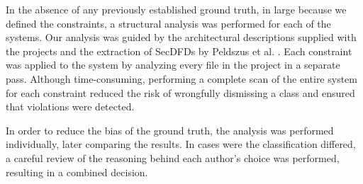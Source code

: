 In the absence of any previously established ground truth, in large because we defined the constraints, a structural analysis was performed for each of the systems. Our analysis was guided by the architectural descriptions supplied with the projects and the extraction of SecDFDs by Peldszus et al. \cite{peldszus_secure_2019}. Each constraint was applied to the system by analyzing every file in the project in a separate pass. Although time-consuming, performing a complete scan of the entire system for each constraint reduced the risk of wrongfully dismissing a class and ensured that violations were detected.

In order to reduce the bias of the ground truth, the analysis was performed individually, later comparing the results. In cases were the classification differed, a careful review of the reasoning behind each author's choice was performed, resulting in a combined decision. 



